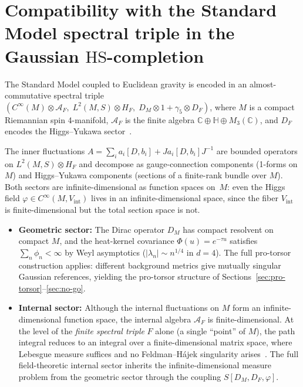 \documentclass[12pt,a4paper]{article}
\theoremstyle{plain}
\theoremstyle{definition}
\theoremstyle{remark}
\newcommand{\HS}{\mathrm{HS}}
\begin{document}
\section{Compatibility with the Standard Model spectral triple
  in the Gaussian $\HS$-completion}
\label{sec:SM}

The Standard Model coupled to Euclidean gravity is encoded in an
almost-commutative spectral triple
$(C^\infty(M) \otimes \mathcal{A}_F,\; L^2(M,S) \otimes H_F,\;
D_M \otimes 1 + \gamma_5 \otimes D_F)$, where $M$ is a compact
Riemannian spin 4-manifold, $\mathcal{A}_F$ is the finite algebra
$\mathbb{C} \oplus \mathbb{H} \oplus M_3(\mathbb{C})$, and $D_F$
encodes the Higgs--Yukawa sector~\cite{CCM:2007,vS:2015}.

The inner fluctuations $A = \sum_i a_i[D,b_i] + J a_i[D,b_i] J^{-1}$
are bounded operators on $L^2(M,S) \otimes H_F$ and decompose as
gauge-connection components (1-forms on $M$) and Higgs--Yukawa
components (sections of a finite-rank bundle over $M$).  Both sectors
are infinite-dimensional as function spaces on~$M$: even the
Higgs field $\varphi \in C^\infty(M, V_{\mathrm{int}})$ lives in an
infinite-dimensional space, since the fiber $V_{\mathrm{int}}$ is
finite-dimensional but the total section space is not.

\begin{itemize}[leftmargin=2em]
  \item \textbf{Geometric sector:}
    The Dirac operator $D_M$ has compact resolvent on compact $M$, and
    the heat-kernel covariance $\Phi(u) = e^{-\tau u}$ satisfies
    $\sum_n \phi_n < \infty$ by Weyl asymptotics
    ($|\lambda_n| \sim n^{1/4}$ in $d=4$).  The full pro-torsor
    construction applies: different background metrics give mutually
    singular Gaussian references, yielding the pro-torsor structure of
    Sections~\ref{sec:pro-torsor}--\ref{sec:no-go}.

  \item \textbf{Internal sector:}
    Although the internal fluctuations on $M$ form an
    infinite-dimensional function space, the internal algebra
    $\mathcal{A}_F$ is finite-dimensional.  At the level of the
    \emph{finite spectral triple} $F$ alone (a single ``point'' of $M$),
    the path integral reduces to an integral over a finite-dimensional
    matrix space, where Lebesgue measure suffices and no Feldman--H\'ajek
    singularity arises~\cite{BarrettGlaser:2016}.
    The full field-theoretic internal sector inherits the
    infinite-dimensional measure problem from the geometric sector
    through the coupling $S[D_M, D_F, \varphi]$.
\end{itemize}
\end{document}
